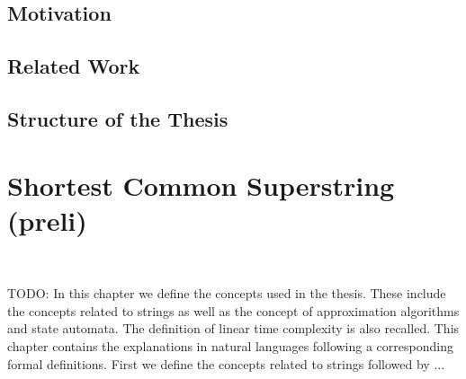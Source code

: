 \documentclass[english,twoside,censored,csm,algorithms-track-2020]{HYthesisML}
\theoremstyle{plain}
\theoremstyle{definition}
\begin{document}
\section{Motivation}
  

  

  \section{Related Work}



  
  \section{Structure of the Thesis}

\chapter {Shortest Common Superstring (preli)}~\label{chp-preli}








TODO:
In this chapter we define the concepts used in the thesis. These include the concepts related to
strings as well as the concept of approximation algorithms and state automata. The definition of
linear time complexity is also recalled. This chapter contains the explanations in natural
languages following a corresponding formal definitions. First we define the concepts related
to strings followed by ...  \\[1in]
\end{document}
